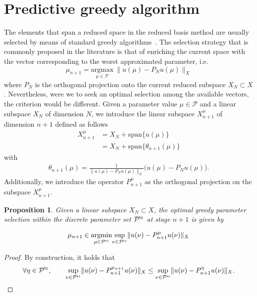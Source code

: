 \documentclass[12pt,a4paper]{article}
\newtheorem{proposition}{Proposition}
\newcommand{\tr}{{\rm tr}}
\newcommand{\calP}{\mathcal P}
\begin{document}
\section{Predictive greedy algorithm}
The elements that span a reduced space in the reduced basis method
are usually selected by means of standard greedy algorithms~\cite{pate,haasdonk13}.
The selection strategy that is commonly proposed in the literature is that of enriching the current space with the vector corresponding to the worst approximated parameter, i.e.
\begin{equation}\label{std_greedy}
\mu_{n+1} = \underset{\mu \in \mathcal P}{\mathrm{argmax}}\ \|u(\mu)-P_N u(\mu)\|_X
\end{equation}
where $P_N$ is the orthogonal projection onto the current reduced subspace $X_{N}\subset X$.
Nevertheless, were we to seek an optimal selection among the available vectors, the criterion would be different.
Given a parameter value $\mu\in\calP$ and a linear subspace $X_N$ of dimension $N$, we introduce the linear subspace $X^\mu_{n+1}$ of dimension $n+1$ defined as follows 
\begin{align*}
X^\mu_{n+1} &= X_N + \mathrm{span}\{u(\mu)\} \\
&=X_N + \mathrm{span}\{\theta_{n+1}(\mu)\} 
\end{align*}
with
\begin{align*}
\theta_{n+1}(\mu) = \frac{1}{\| u(\mu) - P_N u(\mu) \|_X} \big( u(\mu) - P_N u(\mu) \big).
\end{align*}
Additionally, we introduce the operator $P^\mu_{n+1}$ as the orthogonal projection on the subspace $X^\mu_{n+1}$.

\begin{proposition}
Given a linear subspace $X_N\subset X$, the optimal greedy parameter selection within the discrete parameter set $\calP^\tr$ at stage $n+1$ is given by
\end{proposition}
\begin{equation}\label{mod_greedy}
\mu_{n+1} \in \underset{\mu \in \calP^\tr}{\mathrm{argmin}} \underset{\nu \in \calP^\tr} {\mathrm{\ sup\ }}\|u(\nu)- P^\mu_{n+1} u(\nu)\|_X
\end{equation}

\begin{proof}
By construction, it holds that 
$$
\forall \eta\in\calP^\tr, \qquad\underset{\nu \in \calP^\tr} {\mathrm{\ sup\ }}\|u(\nu)- P^{\mu_{n+1}}_{n+1} u(\nu)\|_X
\leq
\underset{\nu \in \calP^\tr} {\mathrm{\ sup\ }} \|u(\nu)- P^\eta_{n+1} u(\nu)\|_X.
$$
\end{proof}
\end{document}
